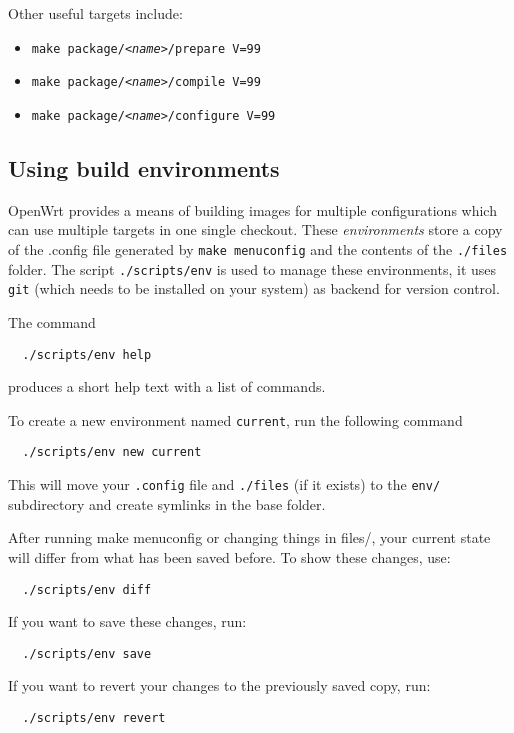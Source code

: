 Other useful targets include:

\begin{itemize}
    \item \texttt{make package/\textit{<name>}/prepare V=99}
    \item \texttt{make package/\textit{<name>}/compile V=99}
    \item \texttt{make package/\textit{<name>}/configure V=99}
\end{itemize}


\subsection{Using build environments}
OpenWrt provides a means of building images for multiple configurations
which can use multiple targets in one single checkout. These \emph{environments}
store a copy of the .config file generated by \texttt{make menuconfig} and the contents
of the \texttt{./files} folder.
The script \texttt{./scripts/env} is used to manage these environments, it uses
\texttt{git} (which needs to be installed on your system) as backend for version control.

The command 
\begin{Verbatim}
  ./scripts/env help
\end{Verbatim}
produces a short help text with a list of commands.

To create a new environment named \texttt{current}, run the following command
\begin{Verbatim}
  ./scripts/env new current
\end{Verbatim}
This will move your \texttt{.config} file and \texttt{./files} (if it exists) to
the \texttt{env/} subdirectory and create symlinks in the base folder.

After running make menuconfig or changing things in files/, your current state will
differ from what has been saved before. To show these changes, use:
\begin{Verbatim}
  ./scripts/env diff
\end{Verbatim}

If you want to save these changes, run:
\begin{Verbatim}
  ./scripts/env save
\end{Verbatim}
If you want to revert your changes to the previously saved copy, run:
\begin{Verbatim}
  ./scripts/env revert
\end{Verbatim}

